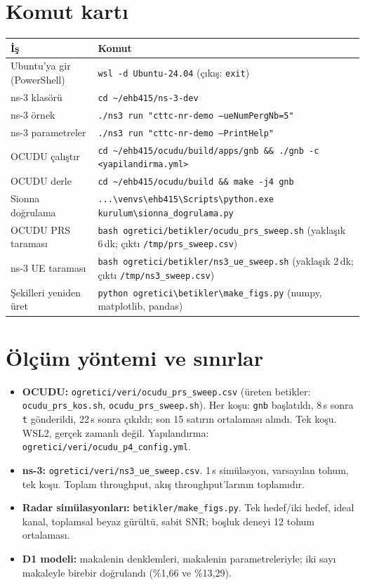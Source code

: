 \section{Komut kartı}\label{ek:komut}

\begingroup\sffamily\small
\begin{xltabular}{\textwidth}{@{}p{3.3cm}X@{}}
\toprule
\textbf{İş} & \textbf{Komut} \\
\midrule
Ubuntu'ya gir (PowerShell) & \texttt{wsl -d Ubuntu-24.04} \quad (çıkış: \texttt{exit}) \\
ns-3 klasörü & \texttt{cd \textasciitilde/ehb415/ns-3-dev} \\
ns-3 örnek & \texttt{./ns3 run "cttc-nr-demo --ueNumPergNb=5"} \\
ns-3 parametreler & \texttt{./ns3 run "cttc-nr-demo --PrintHelp"} \\
OCUDU çalıştır & \texttt{cd \textasciitilde/ehb415/ocudu/build/apps/gnb \&\& ./gnb -c <yapilandirma.yml>} \\
OCUDU derle & \texttt{cd \textasciitilde/ehb415/ocudu/build \&\& make -j4 gnb} \\
Sionna doğrulama & \texttt{...\textbackslash venvs\textbackslash ehb415\textbackslash Scripts\textbackslash python.exe kurulum\textbackslash sionna\_dogrulama.py} \\
OCUDU PRS taraması & \texttt{bash ogretici/betikler/ocudu\_prs\_sweep.sh} (yaklaşık 6\,dk; çıktı \texttt{/tmp/prs\_sweep.csv}) \\
ns-3 UE taraması & \texttt{bash ogretici/betikler/ns3\_ue\_sweep.sh} (yaklaşık 2\,dk; çıktı \texttt{/tmp/ns3\_sweep.csv}) \\
Şekilleri yeniden üret &\texttt{python ogretici\textbackslash betikler\textbackslash make\_figs.py} (numpy, matplotlib, pandas) \\
\bottomrule
\end{xltabular}
\endgroup

\section{Ölçüm yöntemi ve sınırlar}

\begin{itemize}
\item \textbf{OCUDU:} \texttt{ogretici/veri/ocudu\_prs\_sweep.csv} (üreten betikler: \texttt{ocudu\_prs\_kos.sh}, \texttt{ocudu\_prs\_sweep.sh}). Her koşu: \texttt{gnb} başlatıldı, 8\,s sonra \texttt{t} gönderildi, 22\,s sonra çıkıldı; son 15 satırın ortalaması alındı. Tek koşu. WSL2, gerçek zamanlı değil. Yapılandırma: \texttt{ogretici/veri/ocudu\_p4\_config.yml}.
\item \textbf{ns-3:} \texttt{ogretici/veri/ns3\_ue\_sweep.csv}. 1\,s simülasyon, varsayılan tohum, tek koşu. Toplam throughput, akış throughput'larının toplamıdır.
\item \textbf{Radar simülasyonları:} \texttt{betikler/make\_figs.py}. Tek hedef/iki hedef, ideal kanal, toplamsal beyaz gürültü, sabit SNR; boşluk deneyi 12 tohum ortalaması.
\item \textbf{D1 modeli:} makalenin denklemleri, makalenin parametreleriyle; iki sayı makaleyle birebir doğrulandı (\%1,66 ve \%13,29).
\end{itemize}

